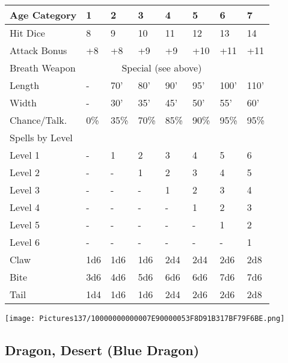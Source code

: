 \documentclass[a4paper,twoside,openany,10pt]{book}
\begin{document}
\begin{multicols}{2}
\begin{flushleft}
\begin{tabularx}{0.47\textwidth}{@{}lXXXXXXX@{}}
	Age Category & 1 & 2 & 3 & 4 & 5 & 6 & 7 \\\hline
	Hit Dice & 8 & 9 & 10 & 11 & 12 & 13 & 14 \\\hline
	Attack Bonus & +8 & +8 & +9 & +9 & +10 & +11 & +11 \\\hline
	Breath Weapon &  \multicolumn{6}{c}{Special (see above)}\\\hline
	Length & - & 70' & 80' & 	90' & 95' & 100' &	110' \\\hline
	Width & - & 30' & 35' & 	45' & 50' & 55' &	60' \\\hline
	Chance/Talk. & 0\% & 35\% & 70\% & 85\% & 90\% & 95\% & 95\% \\\hline
	Spells by Level & & & & & & & \\\hline
	Level 1 & - & 1 & 2 & 3 & 4 & 5 & 6 \\\hline
	Level 2 & - & - & 1 & 2 & 3 & 4 & 5 \\\hline
	Level 3 & - & - & - & 1 & 2 & 3 & 4 \\\hline
	Level 4 & - & - & - & - & 1 & 2 & 3 \\\hline
	Level 5 & - & - & - & - & - & 1 & 2 \\\hline
	Level 6 & - & - & - & - & - & - & 1 \\\hline
	Claw & 1d6 & 1d6 & 1d6 & 2d4 & 2d4 & 2d6 & 2d8 \\\hline
	Bite & 3d6 & 4d6 & 5d6 & 6d6 & 6d6 & 7d6 & 7d6 \\\hline
	Tail & 1d4 & 1d6 & 1d6 & 2d4 & 2d6 & 2d6 & 2d8 \\\hline
\end{tabularx}
\end{flushleft}

\vfill

\begin{center}
	\texttt{[image: Pictures137/10000000000007E90000053F8D91B317BF79F6BE.png]}
\end{center}

\pagebreak


\subsection*{Dragon, Desert (Blue Dragon)}\label{dragon-desert-blue-dragon}


\end{multicols}
\end{document}
